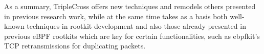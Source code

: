 As a summary, TripleCross offers new techniques and remodels others presented in previous research work, while at the same time takes as a basis both well-known techniques in rootkit development and also those already presented in previous eBPF rootkits which are key for certain functionalities, such as ebpfkit's TCP retransmissions for duplicating packets.

